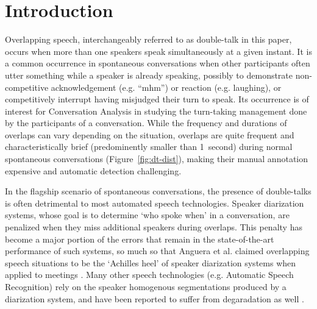 \documentclass[a4paper]{article}
\begin{document}
\section{Introduction}

Overlapping speech, interchangeably referred to as double-talk in this paper,
occurs when more than one speakers speak simultaneously at a given instant.
It is a common occurrence in spontaneous conversations when
other participants often utter something while a speaker is already speaking,
possibly to demonstrate non-competitive acknowledgement (e.g. ``mhm'') or reaction (e.g. laughing),
or competitively interrupt having misjudged their turn to speak.
Its occurrence is of interest for Conversation Analysis in studying the
turn-taking management done by the participants of a conversation.
While the frequency and durations of overlaps can vary depending on the situation,
overlaps are quite frequent and characteristically brief (predominently smaller than 1~second)
during normal spontaneous conversations (Figure~\ref{fig:dt-dist}),
making their manual annotation expensive and automatic detection challenging.

In the flagship scenario of spontaneous conversations,
the presence of double-talks is often detrimental to most automated speech technologies.
Speaker diarization systems, whose goal is to determine `who spoke when' in a conversation,
are penalized when they miss additional speakers during overlaps.
This penalty has become a major portion of the errors that remain in the
state-of-the-art performance of such systems,
so much so that Anguera et al. claimed overlapping speech situations to be the `Achilles heel' of
speaker diarization systems when applied to meetings \cite{anguera_speaker_2012}.
Many other speech technologies (e.g. Automatic Speech Recognition)
rely on the speaker homogenous segmentations produced by a diarization system,
and have been reported to suffer from degaradation as well \cite{cetin_speaker_2006,RenalsDistantspeechrecognition2017}.
\end{document}
